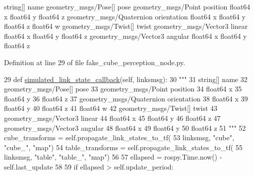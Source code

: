 \begin{DoxyVerb}string[] name
geometry_msgs/Pose[] pose
  geometry_msgs/Point position
    float64 x
    float64 y
    float64 z
  geometry_msgs/Quaternion orientation
    float64 x
    float64 y
    float64 z
    float64 w
geometry_msgs/Twist[] twist
  geometry_msgs/Vector3 linear
    float64 x
    float64 y
    float64 z
  geometry_msgs/Vector3 angular
    float64 x
    float64 y
    float64 z
\end{DoxyVerb}
 

Definition at line 29 of file fake\+\_\+cube\+\_\+perception\+\_\+node.\+py.


\begin{DoxyCode}
29     \textcolor{keyword}{def }\hyperlink{classfake__cube__perception__node_1_1FakePerceptionNode_ac1127eae8d2eda994b22873529bd198f}{simulated\_link\_state\_callback}(self, linksmsg):
30         \textcolor{stringliteral}{"""}
31 \textcolor{stringliteral}{        string[] name}
32 \textcolor{stringliteral}{        geometry\_msgs/Pose[] pose}
33 \textcolor{stringliteral}{          geometry\_msgs/Point position}
34 \textcolor{stringliteral}{            float64 x}
35 \textcolor{stringliteral}{            float64 y}
36 \textcolor{stringliteral}{            float64 z}
37 \textcolor{stringliteral}{          geometry\_msgs/Quaternion orientation}
38 \textcolor{stringliteral}{            float64 x}
39 \textcolor{stringliteral}{            float64 y}
40 \textcolor{stringliteral}{            float64 z}
41 \textcolor{stringliteral}{            float64 w}
42 \textcolor{stringliteral}{        geometry\_msgs/Twist[] twist}
43 \textcolor{stringliteral}{          geometry\_msgs/Vector3 linear}
44 \textcolor{stringliteral}{            float64 x}
45 \textcolor{stringliteral}{            float64 y}
46 \textcolor{stringliteral}{            float64 z}
47 \textcolor{stringliteral}{          geometry\_msgs/Vector3 angular}
48 \textcolor{stringliteral}{            float64 x}
49 \textcolor{stringliteral}{            float64 y}
50 \textcolor{stringliteral}{            float64 z}
51 \textcolor{stringliteral}{        """}
52         cube\_transforms = self.propagate\_link\_states\_to\_tf(
53             linksmsg, \textcolor{stringliteral}{"cube"}, \textcolor{stringliteral}{"cube\_"}, \textcolor{stringliteral}{"map"})
54         table\_transforms = self.propagate\_link\_states\_to\_tf(
55             linksmsg, \textcolor{stringliteral}{"table"}, \textcolor{stringliteral}{"table\_"}, \textcolor{stringliteral}{"map"})
56 
57         ellapsed = rospy.Time.now() - self.last\_update
58 
59         \textcolor{keywordflow}{if} ellapsed > self.update\_period:

\end{DoxyCode}
